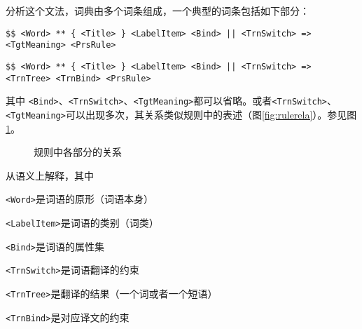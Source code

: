 \documentclass{article}
\begin{document}
\begin{CJK}{UTF8}{gbsn}
分析这个文法，词典由多个词条组成，一个典型的词条包括如下部分：

\begin{verbatim}
$$ <Word> ** { <Title> } <LabelItem> <Bind> || <TrnSwitch> => <TgtMeaning> <PrsRule>
\end{verbatim}

\begin{verbatim}
$$ <Word> ** { <Title> } <LabelItem> <Bind> || <TrnSwitch> => <TrnTree> <TrnBind> <PrsRule>
\end{verbatim}

其中 \verb|<Bind>|、\verb|<TrnSwitch>|、\verb|<TgtMeaning>|都可以省略。或者\verb|<TrnSwitch>|、\verb|<TgtMeaning>|可以出现多次，其关系类似规则中的表述（图\ref{fig:rulerela}）。参见图\ref{fig:dictrela}。

\begin{figure}
  \begin{center}
  \end{center}
  \caption{规则中各部分的关系}
  \label{fig:dictrela}
\end{figure}

从语义上解释，其中
\begin{itemize*}
\item \verb|<Word>|是词语的原形（词语本身）
\item \verb|<LabelItem>|是词语的类别（词类）
\item \verb|<Bind>|是词语的属性集
\item \verb|<TrnSwitch>|是词语翻译的约束
\item \verb|<TrnTree>|是翻译的结果（一个词或者一个短语）
\item \verb|<TrnBind>|是对应译文的约束
\end{itemize*}


\end{CJK}
\end{document}
